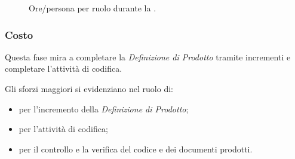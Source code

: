 
\begin{figure}[H]
\caption{Ore/persona per ruolo durante la \PDC.}
\label{fig:pdc2}

\end{figure}

\pagebreak
\subsubsection{Costo \PDC}
\introcosto{\PDC}
Questa fase mira a completare la \emph{Definizione di Prodotto} tramite incrementi e completare l'attività di codifica.

Gli sforzi maggiori si evidenziano nel ruolo di:
\begin{itemize}
\item {\PJx} per l'incremento della \emph{Definizione di Prodotto};
\item {\PGx} per l'attività di codifica;
\item {\Vx} per il controllo e la verifica del codice e dei documenti prodotti.
\end{itemize}

